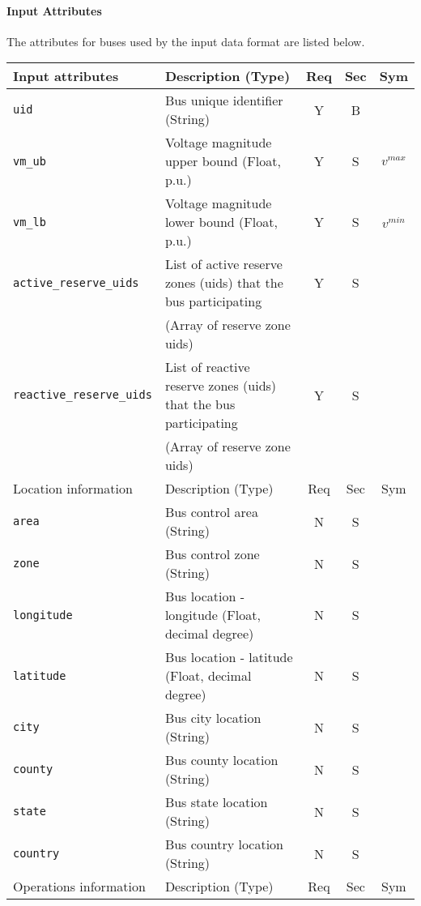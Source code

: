\documentclass{article}
\begin{document}
\paragraph{Input Attributes} The attributes for buses used by the input data format are listed below.

\begin{center}
\small
\begin{tabular}{ l | l | c | c | c |}
Input attributes & Description (Type) & Req & Sec & Sym\\
\hline
  {\tt uid} & Bus unique identifier (String)& Y & B &  \\
  {\tt vm\_ub} & Voltage magnitude upper bound (Float, p.u.)& Y & S & $v^{max}$\\
  {\tt vm\_lb} & Voltage magnitude lower bound (Float, p.u.)& Y & S & $v^{min}$\\
  {\tt active\_reserve\_uids} & List of active reserve zones (uids) that the bus participating & Y & S & \\
                     &  (Array of reserve zone uids) &  & & \\
  {\tt reactive\_reserve\_uids} & List of reactive reserve zones (uids) that the bus participating & Y & S & \\
                     &  (Array of reserve zone uids) &  & & \\
  \hline
  Location information & Description (Type) & Req & Sec & Sym\\
  \hline
  {\tt area} &  Bus control area (String)& N & S & \\
  {\tt zone} &  Bus control zone (String)& N & S & \\
  {\tt longitude} & Bus location - longitude (Float, decimal degree) & N & S & \\
  {\tt latitude} & Bus location - latitude   (Float, decimal degree) & N & S & \\
  {\tt city}     & Bus city location (String) & N & S & \\
  {\tt county}     & Bus county location (String) & N & S & \\
  {\tt state}    & Bus state location (String) & N & S & \\
  {\tt country}  & Bus country location (String) & N & S & \\
  \hline
    Operations information & Description (Type) & Req & Sec & Sym\\

\end{tabular}
\end{center}
\end{document}

